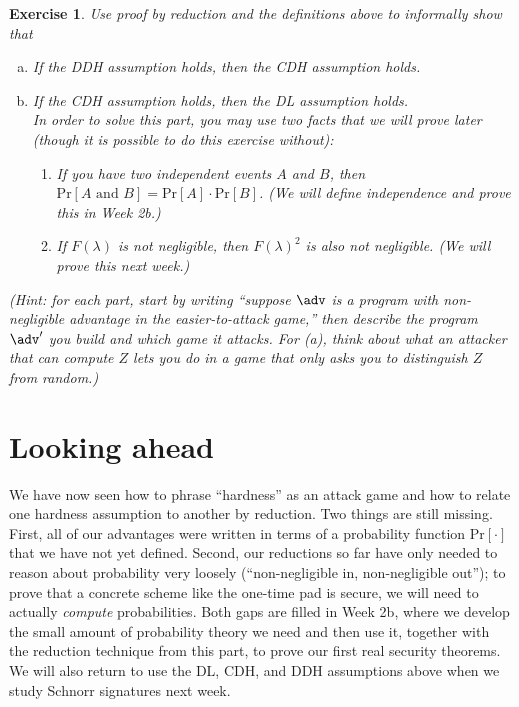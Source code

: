 \documentclass[12pt]{article}
\newcommand{\pr}[1]{\text{Pr}\left[#1\right]}
\newtheorem{exercise}{Exercise}
\theoremstyle{definition}
\theoremstyle{remark}
\theoremstyle{definition}
\begin{document}
\begin{exercise} Use proof by reduction and the definitions above to informally show that
\begin{enumerate}[(a)]
\item If the DDH assumption holds, then the CDH assumption holds.
\item If the CDH assumption holds, then the DL assumption holds.\\
In order to solve this part, you may use two facts that we will prove later (though it is possible to do this exercise without):
\begin{enumerate}[(1)]
\item If you have two independent events $A$ and $B$, then $\pr{A\text{ and }B} = \pr{A}\cdot\pr{B}$. (We will define independence and prove this in Week 2b.)
\item If $F(\lambda)$ is not negligible, then $F(\lambda)^2$ is also not negligible. (We will prove this next week.)
\end{enumerate}
\end{enumerate}
(Hint: for each part, start by writing ``suppose $\adv$ is a program with non-negligible advantage in the \emph{easier-to-attack} game,'' then describe the program $\adv'$ you build and which game it attacks. For (a), think about what an attacker that can \emph{compute} $Z$ lets you do in a game that only asks you to \emph{distinguish} $Z$ from random.)
\end{exercise}

\section*{Looking ahead}

We have now seen how to phrase ``hardness'' as an attack game and how to relate one hardness assumption to another by reduction. Two things are still missing. First, all of our advantages were written in terms of a probability function $\pr{\cdot}$ that we have not yet defined. Second, our reductions so far have only needed to reason about probability very loosely (``non-negligible in, non-negligible out''); to prove that a concrete scheme like the one-time pad is secure, we will need to actually \emph{compute} probabilities. Both gaps are filled in Week 2b, where we develop the small amount of probability theory we need and then use it, together with the reduction technique from this part, to prove our first real security theorems. We will also return to use the DL, CDH, and DDH assumptions above when we study Schnorr signatures next week.
\end{document}
